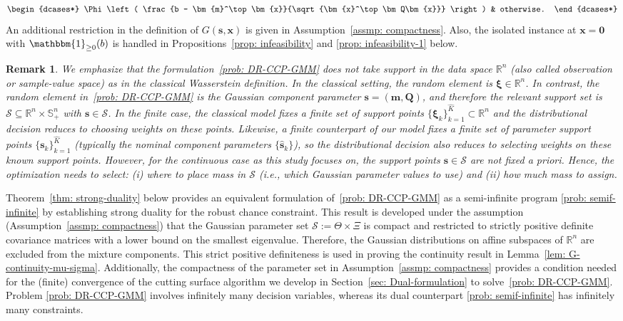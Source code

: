 \documentclass[opre,sglanonrev]{informs4}
\newtheorem{remark}{Remark}
\newcommand{\mS}{\mathcal{S}}
\newcommand{\mbR}{\mathbb R}
\newcommand{\mbS}{\mathbb S}
\newcommand{\bxi}{\bm{\xi}}
\newcommand{\bzero}{\bm{0}}
\newcommand{\bmean}{\bm{m}}
\newcommand{\bs}{\bm{s}}
\newcommand{\bx}{\bm{x}}
\newcommand{\bQ}{\bm Q}
\begin{document}
{\begin{align}
\begin{dcases*}
        \Phi \left( \frac{b - \bmean^\top \bx}{\sqrt{\bx^\top \bQ \bx}} \right) & otherwise.
    \end{dcases*}
\end{align}
An additional restriction in the definition of $G(\bs,\bx)$ is given in Assumption~\ref{assmp: compactness}. Also, the isolated instance at $\bx =\bzero$ with $\mathbbm{1}_{\geq 0}(b)$ is handled in Propositions~\ref{prop: infeasibility} and \ref{prop: infeasibility-1} below.
\begin{remark}
    We emphasize that the formulation~\eqref{prob: DR-CCP-GMM} does not take support in the data space $\mbR^n$ (also called observation or sample-value space) as in the classical Wasserstein definition. In the classical setting, the random element is $\bxi\in\mbR^n$. In contrast, the random element in~\eqref{prob: DR-CCP-GMM} is the Gaussian component parameter $\bs=(\bmean,\bQ)$, and therefore the relevant support set is $\mS\subseteq \mbR^n\times \mbS_+^n$ with $\bs\in\mS$. In the finite case, the classical model fixes a finite set of support points $\{\bxi_k\}_{k=1}^{\hat{K}}\subset\mbR^n$ and the distributional decision reduces to choosing weights on these points. Likewise, a finite counterpart of our model fixes a finite set of parameter support points $\{\bs_k\}_{k=1}^{\hat{K}}$  (typically the nominal component parameters $\{\hat{\bs}_k\}$), so the distributional decision also reduces to selecting weights on these known support points. However, for the continuous case as this study focuses on, the support points $\bs\in\mS$ are not fixed \emph{a priori}. Hence, the optimization needs to select: (i) where to place mass in $\mS$ (i.e., which Gaussian parameter values to use) and (ii) how much mass to assign.
\end{remark}
Theorem~\ref{thm: strong-duality} below provides an equivalent formulation of~\eqref{prob: DR-CCP-GMM} as a semi-infinite program  \eqref{prob: semif-infinite} by establishing strong duality for the robust chance constraint.  This result is developed under the assumption (Assumption~\ref{assmp: compactness}) that the Gaussian parameter set $\mS:=\Theta\times\Xi$ is compact and restricted to strictly positive definite covariance matrices with a lower bound on the smallest eigenvalue. Therefore, the Gaussian distributions on affine subspaces of $\mathbb{R}^n$ are excluded from the mixture components. This strict positive definiteness is used in proving the continuity result in Lemma~\ref{lem: G-continuity-mu-sigma}. Additionally, the compactness of the parameter set in Assumption~\ref{assmp: compactness} provides a condition needed for 
the (finite) convergence of the cutting surface algorithm we develop in Section~\ref{sec: Dual-formulation} to solve~\ref{prob: DR-CCP-GMM}. Problem \eqref{prob: DR-CCP-GMM} involves infinitely many decision variables, whereas its dual counterpart \eqref{prob: semif-infinite} has infinitely many constraints. 

}
\end{document}
